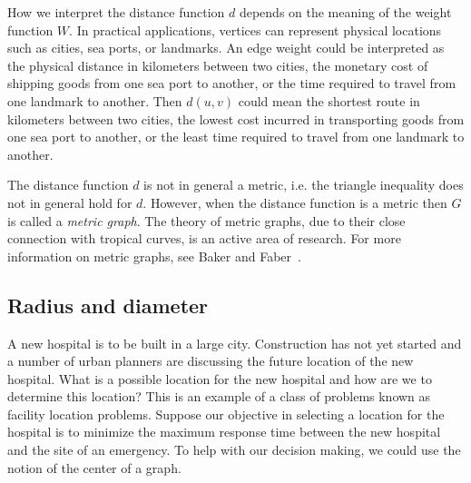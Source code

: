 How we interpret the distance function $d$ depends on the meaning of
the weight function $W$. In practical applications, vertices can
represent physical locations such as cities, sea ports, or
landmarks. An edge weight could be interpreted as the physical
distance in kilometers between two cities, the monetary cost of
shipping goods from one sea port to another, or the time required to
travel from one landmark to another. Then $d(u,v)$ could mean the
shortest route in kilometers between two cities, the lowest cost
incurred in transporting goods from one sea port to another, or the
least time required to travel from one landmark to another.

The distance function $d$ is not in general a
metric, i.e. the triangle
inequality does not in general hold for
$d$. However, when the distance function is a metric then $G$ is
called a \emph{metric graph}. The theory of
metric graphs, due to their close connection with
tropical curves, is an active area of research. For more information
on metric graphs, see Baker and
Faber~\cite{BakerFaber2006}.



\subsection{Radius and diameter}

A new hospital is to be built in a large city. Construction has not
yet started and a number of urban planners are discussing the future
location of the new hospital. What is a possible location for the new
hospital and how are we to determine this location? This is an example
of a class of problems known as facility location problems. Suppose
our objective in selecting a location for the hospital is to minimize
the maximum response time between the new hospital and the site of an
emergency. To help with our decision making, we could use the notion
of the center of a graph.

